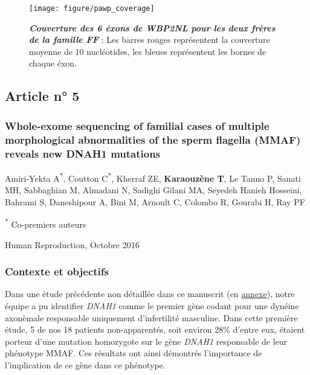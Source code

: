 \documentclass[12pt,twoside]{ugathesis}
\begin{document}
\begin{figure}

{\centering \texttt{[image: figure/pawp\_coverage]} 

}

\caption[Couverture des 6 éxons de WBP2NL pour les deux frères de la famille FF]{\textbf{\emph{Couverture des 6 éxons de \emph{WBP2NL}
pour les deux frères de la famille FF}} : Les barres rouges représentent
la couverture moyenne de 10 nucléotides, les bleues représentent les
bornes de chaque éxon.}\label{fig:plotcovplcz}
\end{figure}






\newpage

\subsection{Article n° 5}\label{article-n-5}

\subsubsection{Whole-exome sequencing of familial cases of multiple
morphological abnormalities of the sperm flagella (MMAF) reveals new
DNAH1
mutations}\label{whole-exome-sequencing-of-familial-cases-of-multiple-morphological-abnormalities-of-the-sperm-flagella-mmaf-reveals-new-dnah1-mutations}

Amiri-Yekta A\textsuperscript{*}, Coutton C\textsuperscript{*}, Kherraf
ZE, \textbf{Karaouzène T}, Le Tanno P, Sanati MH, Sabbaghian M, Almadani
N, Sadighi Gilani MA, Seyedeh Hanieh Hosseini, Bahrami S, Daneshipour A,
Bini M, Arnoult C, Colombo R, Gourabi H, Ray PF

\textsuperscript{*} Co-premiers auteurs

Human Reproduction, Octobre 2016

\newpage

\subsubsection{Contexte et objectifs}\label{contexte-et-objectifs-2}

Dans une étude précédente non détaillée dans ce manuscrit (en
\protect\hyperlink{dnah12014}{annexe}), notre équipe a pu identifier
\emph{DNAH1} comme le premier gène codant pour une dynéine axonèmale
responsable uniquement d'infertilité masculine. Dans cette première
étude, 5 de nos 18 patients non-apparentés, soit environ 28\% d'entre
eux, étaient porteur d'une mutation homozygote sur le gène \emph{DNAH1}
responsable de leur phénotype MMAF. Ces résultats ont ainsi démontrés
l'importance de l'implication de ce gène dans ce phénotype.
\end{document}
